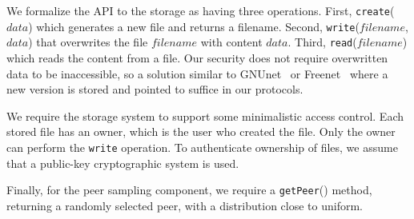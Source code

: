 We formalize the API to the storage as having three
operations. First, \texttt{create}($data$) which generates a new file and
returns a filename. Second, \texttt{write}($filename$, $data$) that
overwrites the file $filename$ with content $data$. Third,
\texttt{read}($filename$) which reads the content from a file. Our security
does not require overwritten data to be inaccessible, so a solution
similar to GNUnet~\cite{Bennett03} or
Freenet~\cite{Clarke10} where a new version is stored and
pointed to suffice in our protocols.

We require the storage system to support some minimalistic access control.
Each stored file has an owner, which is the user who created the file.  Only
the owner can perform the \texttt{write} operation. To authenticate ownership
of files, we assume that a public-key cryptographic system is used.

Finally, for the peer sampling component, we require a \texttt{getPeer}() method,
returning a randomly selected peer, with a distribution close to uniform.

